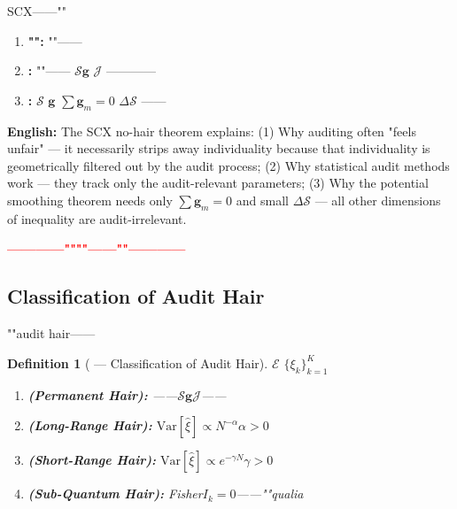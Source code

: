 \documentclass[12pt,a4paper]{article}
\newtheorem{definition}[theorem]{Definition}
\theoremstyle{remark}
\newcommand{\Var}{\mathrm{Var}}
\newcommand{\g}{\mathbf{g}}
\newcommand{\honestcrit}[1]{%
    \textcolor{red}{\textbf{#1}}%
}
\begin{document}
\noindent
\textbf{} SCX——""



\begin{enumerate}[label=(\arabic*)]
    \item \textbf{"":} ""——
    
    \item \textbf{:} ""—— $\mathcal{S}$$\g$  $\mathcal{J}$ ————
    
    \item \textbf{:}  $\mathcal{S}$  $\g$  $\sum\g_m=0$  $\Delta\mathcal{S}$ ——
\end{enumerate}

\vspace{4pt}
\noindent
\textbf{English:} The SCX no-hair theorem explains: (1) Why auditing often "feels unfair" — it necessarily strips away individuality because that individuality is geometrically filtered out by the audit process; (2) Why statistical audit methods work — they track only the audit-relevant parameters; (3) Why the potential smoothing theorem needs only $\sum\g_m = 0$ and small $\Delta\mathcal{S}$ — all other dimensions of inequality are audit-irrelevant.

\honestcrit{————""""——""————}

\subsection{}
\subsection{Classification of Audit Hair}

""audit hair——

\begin{definition}[ — Classification of Audit Hair]\label{def:audit_hair}
 $\mathcal{E}$  $\{\xi_k\}_{k=1}^K$
\begin{enumerate}[label=(\alph*)]
    \item \textbf{ (Permanent Hair):} ——$\mathcal{S}$$\g$$\mathcal{J}$——
    \item \textbf{ (Long-Range Hair):} $\Var[\hat{\xi}] \propto N^{-\alpha}$$\alpha > 0$
    \item \textbf{ (Short-Range Hair):} $\Var[\hat{\xi}] \propto e^{-\gamma N}$$\gamma > 0$
    \item \textbf{ (Sub-Quantum Hair):} Fisher$I_k = 0$\textbf{}——""qualia
\end{enumerate}
\end{definition}
\end{document}
